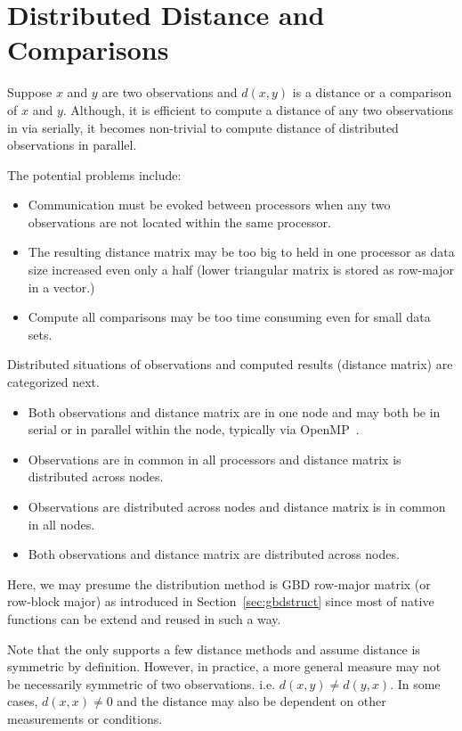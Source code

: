 \section{Distributed Distance and Comparisons}

Suppose $x$ and $y$ are two observations and $d(x, y)$ is a distance or
a comparison of $x$ and $y$.
Although, it is efficient to compute a distance of any two observations
in  via 
serially, it becomes non-trivial to
compute distance of distributed observations in parallel.

The potential problems include:
\begin{itemize}
\item
Communication must be evoked between processors when any two observations
are not located within the same processor.
\item
The resulting distance matrix may be too big
to held in one processor as data size increased even only a half (lower
triangular matrix is stored as row-major in a vector.)
\item
Compute all comparisons may be too time consuming even for small data sets. 
\end{itemize}

Distributed situations of observations and computed results (distance
matrix) are categorized next.
\begin{itemize}
\item Both observations and distance matrix are in one node and may both be
      in serial or in parallel within the node, typically via
      OpenMP~\citep{OpenMP}.
\item Observations are in common in all processors
      and distance matrix is distributed across nodes.
\item Observations are distributed across nodes
      and distance matrix is in common in all nodes.
\item Both observations and distance matrix are distributed
      across nodes.
\end{itemize}
Here, we may presume the distribution method is GBD row-major matrix (or
row-block major) as introduced in Section~\ref{sec:gbdstruct} since most of
native  functions can be extend and reused in such a way.

Note that the  only supports a few distance methods and assume
distance is symmetric by definition. However,
in practice, a more general measure may not be necessarily
symmetric of two observations. i.e. $d(x, y) \neq d(y, x)$.
In some cases, $d(x, x) \neq 0$ and the distance may also be dependent
on other measurements or conditions.


